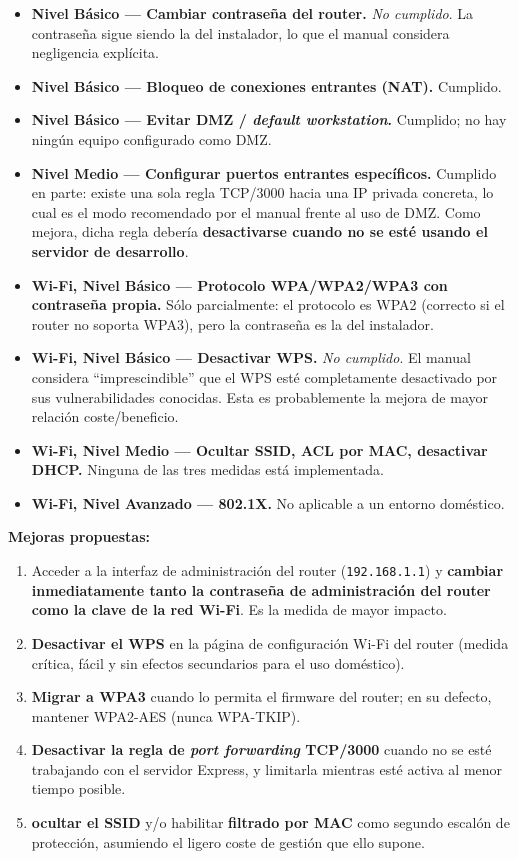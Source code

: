 \begin{itemize}[leftmargin=*]
    \item \textbf{Nivel Básico --- Cambiar contraseña del router.} \emph{No cumplido}. La contraseña sigue siendo la del instalador, lo que el manual considera negligencia explícita.
    \item \textbf{Nivel Básico --- Bloqueo de conexiones entrantes (NAT).} Cumplido.
    \item \textbf{Nivel Básico --- Evitar DMZ / \textit{default workstation}.} Cumplido; no hay ningún equipo configurado como DMZ.
    \item \textbf{Nivel Medio --- Configurar puertos entrantes específicos.} Cumplido en parte: existe una sola regla TCP/3000 hacia una IP privada concreta, lo cual es el modo recomendado por el manual frente al uso de DMZ. Como mejora, dicha regla debería \textbf{desactivarse cuando no se esté usando el servidor de desarrollo}.
    \item \textbf{Wi-Fi, Nivel Básico --- Protocolo WPA/WPA2/WPA3 con contraseña propia.} Sólo parcialmente: el protocolo es WPA2 (correcto si el router no soporta WPA3), pero la contraseña es la del instalador.
    \item \textbf{Wi-Fi, Nivel Básico --- Desactivar WPS.} \emph{No cumplido}. El manual considera ``imprescindible'' que el WPS esté completamente desactivado por sus vulnerabilidades conocidas. Esta es probablemente la mejora de mayor relación coste/beneficio.
    \item \textbf{Wi-Fi, Nivel Medio --- Ocultar SSID, ACL por MAC, desactivar DHCP.} Ninguna de las tres medidas está implementada.
    \item \textbf{Wi-Fi, Nivel Avanzado --- 802.1X.} No aplicable a un entorno doméstico.
\end{itemize}

\textbf{Mejoras propuestas:}

\begin{enumerate}[leftmargin=*]
    \item Acceder a la interfaz de administración del router (\texttt{192.168.1.1}) y \textbf{cambiar inmediatamente tanto la contraseña de administración del router como la clave de la red Wi-Fi}. Es la medida de mayor impacto.
    \item \textbf{Desactivar el WPS} en la página de configuración Wi-Fi del router (medida crítica, fácil y sin efectos secundarios para el uso doméstico).
    \item \textbf{Migrar a WPA3} cuando lo permita el firmware del router; en su defecto, mantener WPA2-AES (nunca WPA-TKIP).
    \item \textbf{Desactivar la regla de \textit{port forwarding} TCP/3000} cuando no se esté trabajando con el servidor Express, y limitarla mientras esté activa al menor tiempo posible.
    \item \textbf{ocultar el SSID} y/o habilitar \textbf{filtrado por MAC} como segundo escalón de protección, asumiendo el ligero coste de gestión que ello supone.
\end{enumerate}


